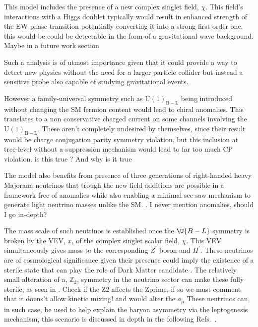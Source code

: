 { \color{gray} This model includes the presence of a new complex singlet field, $\chi$. This field's interactions with a Higgs doublet typically would result in enhanced strength of the EW phase transition potentially converting it into a strong first-order one, this would be could be detectable in the form of a gravitational wave background.} {\color{green} Maybe in a future work section} 


{ \color{gray} Such a analysis is of utmost importance given that it could provide a way to detect new physics without the need for a larger particle collider but instead a sensitive probe also capable of studying gravitational events. } 

However a family-universal symmetry such as $\mathrm{U(1)_{B-L}}$ being introduced without changing the SM fermion content would lead to chiral anomalies. This translates to a non conservative charged current on some channels involving the $\mathrm{U(1)_{B-L}}$. These aren't completely undesired by themselves, since their result would be charge conjugation parity symmetry violation, but this inclusion at tree-level without a suppression mechanism would lead to far too much CP violation. {\color{blue} is this true ? And why is it true}  

The model also benefits from presence of three generations of right-handed heavy Majorana neutrinos that trough the new field additions are possible in a framework free of anomalies while also enabling a minimal see-saw mechanism to generate light neutrino masses unlike the SM.  \cite{Yanagida:1979as,GellMann:1980vs,Mohapatra:1979ia}. {\color{blue} I never mention anomalies, should I go in-depth? } 

The mass scale of such neutrinos is established once the $\U{B-L}$ symmetry is broken {\color{gray} by the VEV, $x$, of the complex singlet scalar field, $\chi$. This VEV simultaneously gives mass to the corresponding $Z^\prime$ boson and $H^\prime$.} 
%
These neutrinos are of cosmological significance given their presence could imply the existence of a sterile state that can play the role of Dark Matter candidate \cite{Kaneta:2016vkq}.
%
The relatively small alteration of a, $\mathbb{Z}_2$, symmetry in the neutrino sector can make these fully sterile, as seen in \cite{Okada:2010wd,Okada:2018ktp}. {\color{red} Check if the Z2 affects the Zprime, if so we must comment that it doens't allow kinetic mixing! and would alter the $a_\mu$ }
%
These neutrinos can, in such case, be used to help explain the baryon asymmetry via the leptogenesis mechanism, this scenario is discussed in depth in the following Refs.~\cite{Fukugita:1986hr,Pilaftsis:1997jf,Pilaftsis:2003gt}. 

